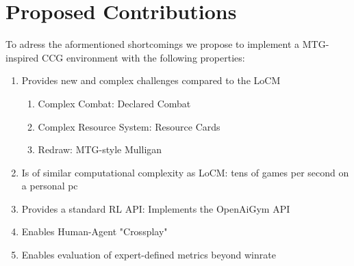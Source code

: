 \documentclass[
	english,%
	accentcolor=9c,%
	type=intern, %
	marginpar=false,%
]{tudapub}
\begin{document}
\section{Proposed Contributions}
To adress the aformentioned shortcomings we propose to implement a MTG-inspired CCG environment with the following properties:
\begin{enumerate}
    \item Provides new and complex challenges compared to the LoCM \cite{2024Taxonomy}
    \begin{enumerate}
        \item Complex Combat: Declared Combat 
        \item Complex Resource System: Resource Cards 
        \item Redraw: MTG-style Mulligan
    \end{enumerate}
    \item Is of similar computational complexity as LoCM: tens of games per second on a personal pc
    \item Provides a standard RL API: Implements the OpenAiGym API
    \item Enables Human-Agent "Crossplay"
    \item Enables evaluation of expert-defined metrics beyond winrate
\end{enumerate}


\printbibliography[heading=bibintoc]
\end{document}
